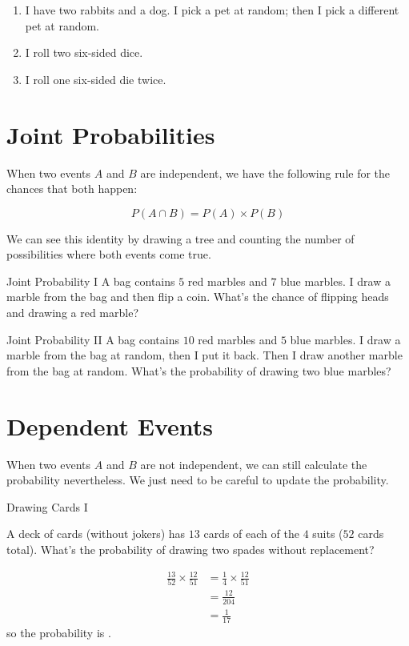\documentclass[a4paper,10pt]{report}
\begin{document}
\begin{enumerate}
 \item I have two rabbits and a dog. I pick a pet at random; then I pick a
 different pet at random.
 \item I roll two six-sided dice.
 \item I roll one six-sided die twice.
\end{enumerate}

\section{Joint Probabilities}

When two events $A$ and $B$ are independent, we have the following rule for the
chances that both happen:

\begin{equation}
 P(A \cap B) = P(A) \times P(B)
\end{equation}

We can see this identity by drawing a tree and counting the number of
possibilities where both events come true.

\begin{problem}{Joint Probability I}
 A bag contains $5$ red marbles and $7$ blue marbles. I draw a marble from the
 bag and then flip a coin. What's the chance of flipping heads and drawing a red
 marble?
\end{problem}

\begin{problem}{Joint Probability II}
 A bag contains $10$ red marbles and $5$ blue marbles. I draw a marble from the
 bag at random, then I put it back. Then I draw another marble from the bag at
 random. What's the probability of drawing two blue marbles?
\end{problem}

\section{Dependent Events}

When two events $A$ and $B$ are not independent, we can still calculate the
probability nevertheless. We just need to be careful to update the probability.

\begin{problem}{Drawing Cards I}

 A deck of cards (without jokers) has $13$ cards of each of the $4$ suits ($52$
 cards total). What's the probability of drawing two spades without replacement?

 \begin{solution}
  \begin{align*}
   \frac{13}{52} \times \frac{12}{51}
   &= \frac{1}{4} \times \frac{12}{51} \\
   &= \frac{12}{204} \\
   &= \frac{1}{17}
  \end{align*}
  so the probability is .
 \end{solution}

\end{problem}
\end{document}
